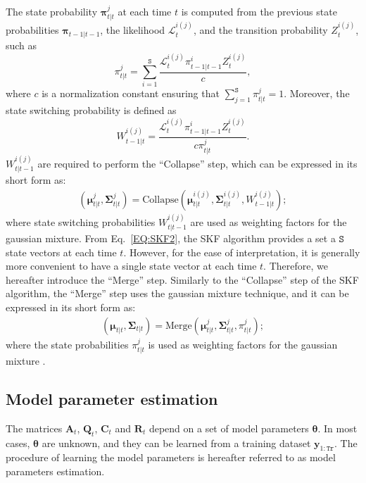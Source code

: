 The state probability $\mathbf{\pi}_{t|t}^{j}$ at each time $t$ is computed from the previous state probabilities $\bm{\pi}_{t-1|t-1}$, the likelihood $\mathcal{L}_{t}^{i(j)}$, and the transition probability $Z_{t}^{i(j)}$, such as
\begin{equation}
\pi_{t|t}^{j} = \sum_{i=1}^{\mathtt{S}} \frac{\mathcal{L}_{t}^{i(j)} \pi_{t-1|t-1}^{i} Z^{i(j)}_{t} }{c},
\label{EQ:StateProbability}
\end{equation}
where $c$ is a normalization constant ensuring that $ \sum_{j=1}^{\mathtt{S}} \pi_{t|t}^{j} = 1 $.
Moreover, the state switching probability is defined as
\begin{equation}
W_{t-1|t}^{i(j)} = \frac{\mathcal{L}_{t}^{i(j)} \pi_{t-1|t-1}^{i} Z^{i(j)}_{t} }{c\pi_{t|t}^{j}}.
\label{EQ:StateSwitchingProbability}
\end{equation}
$W_{t|t-1}^{i(j)}$ are required to perform the ``Collapse'' step, which can be expressed in its short form as:
\begin{equation}
  \begin{split}
  (\bm{\mu}_{t|t}^{j},\bm{\Sigma}_{t|t}^{j}) = \text{Collapse}(\bm{\mu}_{t|t}^{i(j)},\bm{\Sigma}_{t|t}^{i(j)}, W_{t-1|t}^{i(j)} );
    \end{split}
\label{EQ:SKF2}
\end{equation}
where state switching probabilities $W_{t|t-1}^{i(j)}$ are used as weighting factors for the gaussian mixture.
From Eq.~\ref{EQ:SKF2}, the SKF algorithm provides a set a $\mathtt{S}$ state vectors at each time $t$.
However, for the ease of interpretation, it is generally more convenient to have a single state vector at each time $t$.
Therefore, we hereafter introduce the ``Merge'' step.
Similarly to the ``Collapse'' step of the SKF algorithm, the ``Merge'' step uses the gaussian mixture technique, and it can be expressed in its short form as:
\begin{equation}
  \begin{split}
  (\bm{\mu}_{t|t},\bm{\Sigma}_{t|t}) = \text{Merge}(\bm{\mu}_{t|t}^{j},\bm{\Sigma}_{t|t}^{j},  \pi_{t|t}^{j} );
    \end{split}
\label{EQ:SKFCollapse}
\end{equation}
where the state probabilities $\pi_{t|t}^{j}$ is used as weighting factors for the gaussian mixture \cite{Nguyen2018}.

\subsection{Model parameter estimation}
\label{SS:THModelParameterEstimation}
The matrices $\mathbf{A}_{t}$,  $\mathbf{Q}_{t}$,   $\mathbf{C}_{t}$ and  $\mathbf{R}_{t}$ depend on a set of model parameters $\bm{\theta}$.
In most cases, $\bm{\theta}$ are unknown, and they can be learned from a training dataset $\mathbf{y}_{1:\mathtt{Tr}}$.
The procedure of learning the model parameters is hereafter referred to as model parameters estimation.
